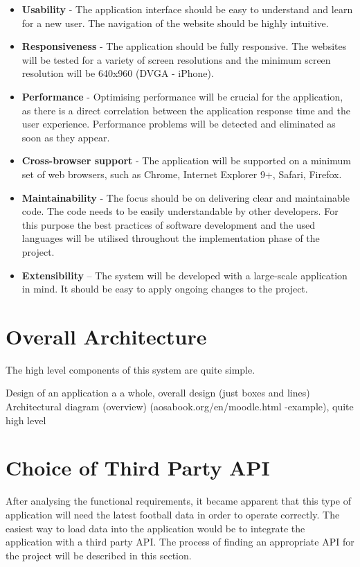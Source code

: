 \begin{itemize}
	\item \textbf{Usability} - The application interface should be easy to understand and learn for a new user. The navigation of the website should be highly intuitive.
	\item \textbf{Responsiveness} - The application should be fully responsive. The websites will be tested for a variety of screen resolutions and the minimum screen resolution will be 640x960 (DVGA - iPhone).
	\item \textbf{Performance} - Optimising performance will be crucial for the application, as there is a direct correlation between the application response time and the user experience.  Performance problems will be detected and eliminated as soon as they appear.
	\item \textbf{Cross-browser support} - The application will be supported on a minimum set of web browsers, such as Chrome, Internet Explorer 9+, Safari, Firefox.
	\item \textbf{Maintainability} - The focus should be on delivering clear and maintainable code. The code needs to be easily understandable by other developers. For this purpose the best practices of software development and the used languages will be utilised throughout the implementation phase of the project.
	\item \textbf{Extensibility} – The system will be developed with a large-scale application in mind. It should be easy to apply ongoing changes to the project.
\end{itemize}

\section{Overall Architecture}
\label{overallarchitecture_req}
The high level components of this system are quite simple.

Design of an application a a whole, overall design (just boxes and lines)
Architectural diagram (overview) (aosabook.org/en/moodle.html -example), quite high level


\section{Choice of Third Party API}
\label{sec:thirdpartyapi_req}
	
After analysing the functional requirements, it became apparent that this type of application will need the latest football data in order to operate correctly. The easiest way to load data into the application would be to integrate the application with a third party API. The process of finding an appropriate API for the project will be described in this section.
	

